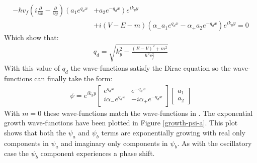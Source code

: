 				\begin{align}
					-\hbar v_{f}\left(i\frac{\partial}{\partial x}-\frac{\partial}{\partial y}\right)\left(a_{1}e^{q_{d}x}\right. &+ \left. a_{2}e^{-q_{d}x}\right)e^{ik_{y}y}\\
					&+i\left(V-E-m\right)\left(\alpha_{-}a_{1}e^{q_{d}x}-\alpha_{+}a_{2}e^{-q_{d}x}\right)e^{ik_{y}y}=0
				\end{align}
				Which show that:
				\begin{align}
					q_{d}=\sqrt{k_{y}^{2}-\frac{\left(E-V\right)^{2}+m^{2}}{\hbar^{2}v_{f}^{2}}}
				\end{align}
				With this value of $q_{d}$ the wave-functions satisfy the Dirac equation so the wave-functions can finally take the form:
				\begin{align}
					\psi=e^{ik_{y}y}
					\left[\begin{array}{ccc}
						e^{q_{d}x}&e^{-q_{d}x}\\
						i\alpha_{-}e^{q_{d}x}&-i\alpha_{+}e^{-q_{d}x}
					\end{array}\right]
					\left[\begin{array}{ccc}
						a_{1}\\
						a_{2}
					\end{array}\right]
					\label{introduction-wf-gd}
				\end{align}
				With $m=0$ these wave-functions match the wave-functions in \cite{b3}. The exponential growth wave-functions have been plotted in Figure \ref{growth-psi-a}. This plot shows that both the $\psi_{a}$ and $\psi_{b}$ terms are exponentially growing with real only components in $\psi_{a}$ and imaginary only components in $\psi_{b}$. As with the oscillatory case the $\psi_{b}$ component experiences a phase shift.
